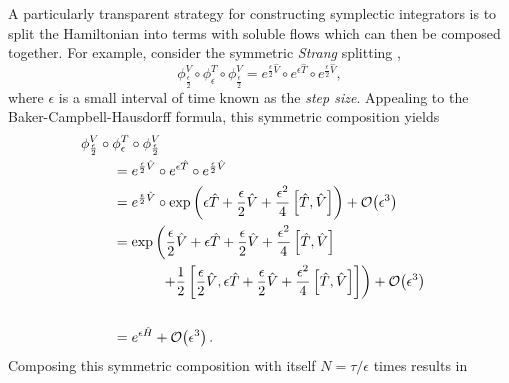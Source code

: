 \documentclass{article}
\begin{document}
A particularly transparent strategy for constructing symplectic integrators is to split 
the Hamiltonian into terms with soluble flows which can then be composed together.  
For example, consider the symmetric \textit{Strang} splitting 
\cite{LeimkuhlerEtAl:2004, HairerEtAl:2006},
%
\begin{equation*}
\phi^{V}_{\frac{\epsilon}{2}} \circ 
\phi^{T}_{\epsilon} \circ 
\phi^{V}_{\frac{\epsilon}{2}}
=
e^{\frac{\epsilon}{2} \hat{V} } \circ 
e^{\epsilon \hat{T} } \circ 
e^{\frac{\epsilon}{2} \hat{V} },
\end{equation*}
%
where $\epsilon$ is a small interval of time known as the \textit{step size}.
Appealing to the Baker-Campbell-Hausdorff formula, this symmetric composition yields
%
\begin{align*}
\phi^{V}_{\frac{\epsilon}{2}} \circ 
\phi^{T}_{\epsilon} \circ 
\phi^{V}_{\frac{\epsilon}{2}}
\\
& \hspace{-12mm} =
e^{\frac{\epsilon}{2} \hat{V} } \circ 
e^{\epsilon \hat{T} } \circ 
e^{\frac{\epsilon}{2} \hat{V} }
\\
& \hspace{-12mm} =
e^{\frac{\epsilon}{2} \hat{V} } \circ 
\exp \left( \epsilon \hat{T} + \frac{\epsilon}{2} \hat{V} 
+ \frac{\epsilon^{2}}{4} \left[ \hat{T}, \hat{V} \right] \right)
+ \mathcal{O} \! \left( \epsilon^{3} \right)
\\
& \hspace{-12mm} =
\exp \left( 
\frac{\epsilon}{2} \hat{V} + \epsilon \hat{T} + \frac{\epsilon}{2} \hat{V} 
+ \frac{\epsilon^{2}}{4} \left[ \hat{T}, \hat{V} \right]
\right.
\\
& \hspace{0mm} \left.
+ \frac{1}{2} \left[ \frac{\epsilon}{2} \hat{V}, \epsilon \hat{T} + \frac{\epsilon}{2} \hat{V} 
+ \frac{\epsilon^{2}}{4} \left[ \hat{T}, \hat{V} \right] \right]
\right)
+ \mathcal{O} \! \left( \epsilon^{3} \right)
\\
\\
& \hspace{-12mm} =
e^{ \epsilon \hat{H} }
+ \mathcal{O} \! \left( \epsilon^{3} \right).
\end{align*}
%
Composing this symmetric composition with itself $N = \tau / \epsilon$ times results in 
\end{document}
